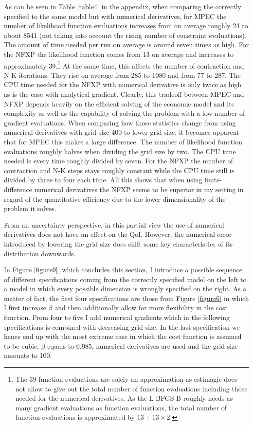As can be seen in Table \ref{table4} in the appendix, when comparing the correctly specified to the same model but with numerical derivatives, for MPEC the number of likelihood function evaluations increases from on average roughly 24 to about 8541 (not taking into account the rising number of constraint evaluations). The amount of time needed per run on average is around seven times as high. For the NFXP the likelihood function comes from 13 on average and increases to approximately 39.\footnote{ The 39 function evaluations are solely an approximation as estimagic does not allow to give out the total number of function evaluations including those needed for the numerical derivatives. As the L-BFGS-B roughly needs as many gradient evaluations as function evaluations, the total number of function evaluations is approximated by $13+13 \times 2$.} At the same time, this affects the number of contraction and N-K iterations. They rise on average from 285 to 1080 and from 77 to 287. The CPU time needed for the NFXP with numerical derivative is only twice as high as is the case with analytical gradient. Clearly, this tradeoff between MPEC and NFXP depends heavily on the efficient solving of the economic model and its complexity as well as the capability of solving the problem with a low number of gradient evaluations. When comparing how those statistics change from using numerical derivatives with grid size 400 to lower grid size, it becomes apparent that for MPEC this makes a large difference. The number of likelihood function evaluations roughly halves when dividing the grid size by two. The CPU time needed is every time roughly divided by seven. For the NFXP the number of contraction and N-K steps stays roughly constant while the CPU time still is divided by three to four each time. All this shows that when using finite-difference numerical derivatives the NFXP seems to be superior in my setting in regard of the quantitative efficiency due to the lower dimensionality of the problem it solves.

From an uncertainty perspective, in this partial view the use of numerical derivatives does not have an effect on the QoI. However, the numerical error introduced by lowering the grid size does shift some key characteristics of its distribution downwards.

In Figure \ref{figure9}, which concludes this section, I introduce a possible sequence of different specifications coming from the correctly specified model on the left to a model in which every possible dimension is wrongly specified on the right. As a matter of fact, the first four specifications are those from Figure \ref{figure6} in which I first increase $\beta$ and then additionally allow for more flexibility in the cost function. From four to five I add numerical gradients which in the following specifications is combined with decreasing grid size. In the last specification we hence end up with the most extreme case in which the cost function is assumed to be cubic, $\beta$ equals to 0.985, numerical derivatives are used and the grid size amounts to 100.


